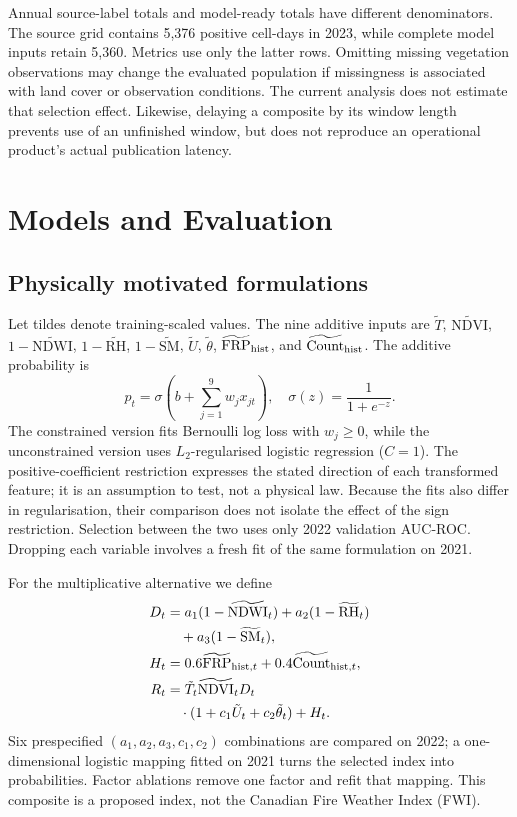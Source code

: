 \documentclass[conference]{IEEEtran}
\begin{document}
Annual source-label totals and model-ready totals have different denominators. The source grid contains 5,376 positive cell-days in 2023, while complete model inputs retain 5,360. Metrics use only the latter rows. Omitting missing vegetation observations may change the evaluated population if missingness is associated with land cover or observation conditions. The current analysis does not estimate that selection effect. Likewise, delaying a composite by its window length prevents use of an unfinished window, but does not reproduce an operational product's actual publication latency.

\section{Models and Evaluation}
\subsection{Physically motivated formulations}
Let tildes denote training-scaled values. The nine additive inputs are $\tilde T$, $\widetilde{\mathrm{NDVI}}$, $1-\widetilde{\mathrm{NDWI}}$, $1-\widetilde{\mathrm{RH}}$, $1-\widetilde{\mathrm{SM}}$, $\tilde U$, $\tilde\theta$, $\widetilde{\mathrm{FRP}}_{\rm hist}$, and $\widetilde{\mathrm{Count}}_{\rm hist}$. The additive probability is
\begin{equation}
 p_t=\sigma\left(b+\sum_{j=1}^{9}w_jx_{jt}\right),\quad
 \sigma(z)=\frac{1}{1+e^{-z}}.
\end{equation}
The constrained version fits Bernoulli log loss with $w_j\geq0$, while the unconstrained version uses $L_2$-regularised logistic regression ($C=1$). The positive-coefficient restriction expresses the stated direction of each transformed feature; it is an assumption to test, not a physical law. Because the fits also differ in regularisation, their comparison does not isolate the effect of the sign restriction. Selection between the two uses only 2022 validation AUC-ROC. Dropping each variable involves a fresh fit of the same formulation on 2021.

For the multiplicative alternative we define
\begin{align}
 D_t &= a_1(1-\widetilde{\mathrm{NDWI}}_t)
       +a_2(1-\widetilde{\mathrm{RH}}_t)\notag\\
     &\quad +a_3(1-\widetilde{\mathrm{SM}}_t),\\
 H_t &= 0.6\widetilde{\mathrm{FRP}}_{{\rm hist},t}
       +0.4\widetilde{\mathrm{Count}}_{{\rm hist},t},\\
 R_t &= \tilde T_t\widetilde{\mathrm{NDVI}}_tD_t\notag\\
     &\quad\cdot(1+c_1\tilde U_t+c_2\tilde\theta_t)+H_t.
\end{align}
Six prespecified $(a_1,a_2,a_3,c_1,c_2)$ combinations are compared on 2022; a one-dimensional logistic mapping fitted on 2021 turns the selected index into probabilities. Factor ablations remove one factor and refit that mapping. This composite is a proposed index, not the Canadian Fire Weather Index (FWI).
\end{document}
